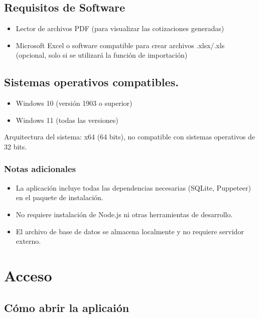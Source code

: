 \documentclass{Pretexto/bluereport}
\begin{document}

\subsection{Requisitos de Software}
\begin{itemize}
    \item Lector de archivos PDF (para visualizar las cotizaciones generadas)
    \item Microsoft Excel o software compatible para crear archivos .xlsx/.xls (opcional, solo si se utilizará la función de importación)
\end{itemize}

\subsection{Sistemas operativos compatibles.}
\begin{itemize}
    \item Windows 10 (versión 1903 o superior)
    \item Windows 11 (todas las versiones)
\end{itemize}

Arquitectura del sistema: x64 (64 bits), no compatible con sistemas operativos de 32 bits.

\subsubsection{Notas adicionales}
\begin{itemize}
    \item La aplicación incluye todas las dependencias necesarias (SQLite, Puppeteer) en el paquete de instalación.
    \item No requiere instalación de Node.js ni otras herramientas de desarrollo.
    \item El archivo de base de datos se almacena localmente y no requiere servidor externo.
\end{itemize}


\section{Acceso}
\subsection{Cómo abrir la aplicaión}
\end{document}

